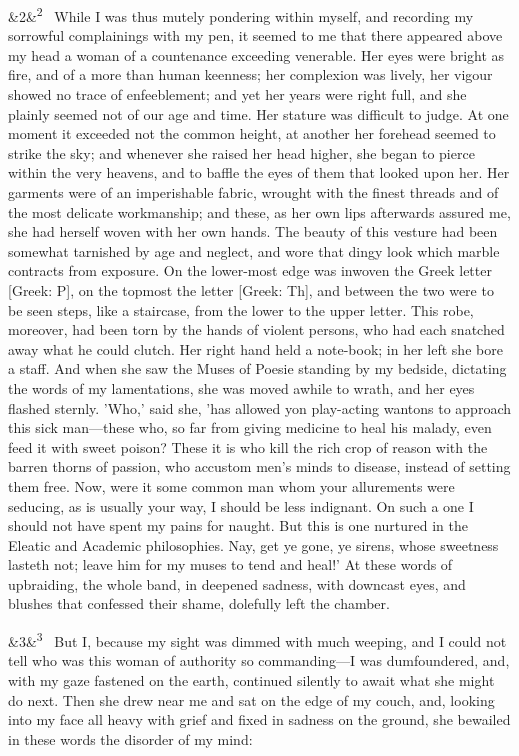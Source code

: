 \documentclass[12pt]{article}
\newcommand{\para}[1][]{\par\noindent\ifx&#1&\else\textsuperscript{\footnotesize #1}~\fi}
\begin{document}
\para[2] While I was thus mutely pondering within myself, and recording my sorrowful complainings with my pen, it seemed to me that there appeared above my head a woman of a countenance exceeding venerable. Her eyes were bright as fire, and of a more than human keenness; her complexion was lively, her vigour showed no trace of enfeeblement; and yet her years were right full, and she plainly seemed not of our age and time. Her stature was difficult to judge. At one moment it exceeded not the common height, at another her forehead seemed to strike the sky; and whenever she raised her head higher, she began to pierce within the very heavens, and to baffle the eyes of them that looked upon her. Her garments were of an imperishable fabric, wrought with the finest threads and of the most delicate workmanship; and these, as her own lips afterwards assured me, she had herself woven with her own hands. The beauty of this vesture had been somewhat tarnished by age and neglect, and wore that dingy look which marble contracts from exposure. On the lower-most edge was inwoven the Greek letter [Greek: P], on the topmost the letter [Greek: Th], and between the two were to be seen steps, like a staircase, from the lower to the upper letter. This robe, moreover, had been torn by the hands of violent persons, who had each snatched away what he could clutch. Her right hand held a note-book; in her left she bore a staff. And when she saw the Muses of Poesie standing by my bedside, dictating the words of my lamentations, she was moved awhile to wrath, and her eyes flashed sternly. 'Who,' said she, 'has allowed yon play-acting wantons to approach this sick man---these who, so far from giving medicine to heal his malady, even feed it with sweet poison? These it is who kill the rich crop of reason with the barren thorns of passion, who accustom men's minds to disease, instead of setting them free. Now, were it some common man whom your allurements were seducing, as is usually your way, I should be less indignant. On such a one I should not have spent my pains for naught. But this is one nurtured in the Eleatic and Academic philosophies. Nay, get ye gone, ye sirens, whose sweetness lasteth not; leave him for my muses to tend and heal!' At these words of upbraiding, the whole band, in deepened sadness, with downcast eyes, and blushes that confessed their shame, dolefully left the chamber.

\para[3] But I, because my sight was dimmed with much weeping, and I could not tell who was this woman of authority so commanding---I was dumfoundered, and, with my gaze fastened on the earth, continued silently to await what she might do next. Then she drew near me and sat on the edge of my couch, and, looking into my face all heavy with grief and fixed in sadness on the ground, she bewailed in these words the disorder of my mind:
\end{document}
